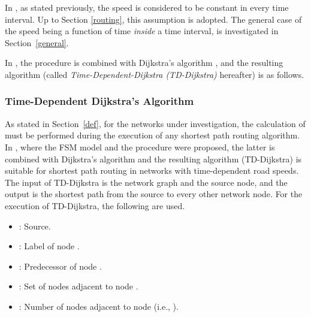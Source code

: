 \documentclass[conference]{IEEEtran}
\begin{document}
In \cite{Sung}, as stated previously, the speed is considered to be constant in every time interval. Up to Section \ref{routing}, this assumption is adopted. The general case of the speed being a function of time \emph{inside} a time interval, is investigated in Section~\ref{general}. 

In \cite{Sung}, the  procedure is combined with Dijkstra's algorithm \cite{dijkstra}, and the resulting algorithm  (called \emph{Time-Dependent-Dijkstra (TD-Dijkstra)} hereafter) is as follows.  


\subsubsection{Time-Dependent Dijkstra's Algorithm}

As stated in Section~\ref{def}, for the networks under investigation, the calculation of  must be performed during the execution of any shortest path routing algorithm. In \cite{Sung}, where the FSM model and the  procedure were proposed, the latter is combined with Dijkstra's algorithm \cite{dijkstra} and the resulting algorithm (TD-Dijkstra) is suitable for shortest path routing in networks with time-dependent road speeds. The input of TD-Dijkstra is the network graph  and the source node, and the output is the shortest path from the source to every other network node. For the execution of TD-Dijkstra, the following are used.

\begin{itemize}
    \item : Source.
    \item : Label of node . 
    \item : Predecessor of node . 
    \item : Set of nodes adjacent to node .
    \item : Number of nodes adjacent to node  (i.e., ).
\end{itemize}
\end{document}
